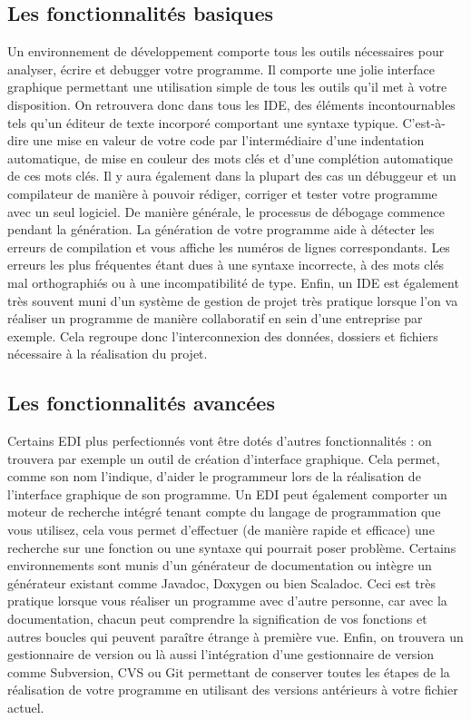\documentclass[a4paper, 12pt]{article}
\begin{document}
\begin{doublespace}
\subsection{Les fonctionnalités basiques}
Un environnement de développement comporte tous les outils nécessaires pour analyser, écrire et debugger votre programme. Il comporte une jolie interface graphique permettant une utilisation simple de tous les outils qu’il met à votre disposition.  On retrouvera donc dans tous les IDE, des éléments incontournables tels qu’un éditeur de texte incorporé comportant une syntaxe typique. C’est-à-dire une  mise en valeur de votre code par l'intermédiaire d'une indentation automatique, de mise en couleur des mots clés et d'une complétion automatique de ces mots clés. Il y aura également dans la plupart des cas un débuggeur et un compilateur de manière à pouvoir rédiger, corriger et tester votre programme avec un seul logiciel. De manière générale, le processus de débogage commence pendant la génération. La génération de votre programme  aide à détecter les erreurs de compilation et vous affiche les numéros de lignes correspondants. Les erreurs les plus fréquentes étant dues à une syntaxe incorrecte, à des mots clés mal orthographiés ou à une incompatibilité de type.  Enfin, un IDE est également très souvent muni d’un système de gestion de projet très pratique lorsque l’on va réaliser un programme de manière collaboratif en sein d’une entreprise par exemple. Cela regroupe donc  l’interconnexion des données, dossiers et fichiers nécessaire à la réalisation du projet.

\newpage \subsection{Les fonctionnalités avancées}
Certains EDI plus perfectionnés vont être dotés d’autres fonctionnalités : on trouvera par exemple un outil de création d’interface graphique. Cela permet, comme son nom l’indique, d’aider le programmeur lors de la réalisation de l’interface graphique de son programme.  Un EDI peut également comporter un moteur de recherche intégré tenant compte du langage de programmation que vous utilisez, cela vous permet d’effectuer (de manière rapide et efficace) une recherche sur une fonction ou une syntaxe qui pourrait poser problème. Certains environnements sont munis d’un générateur de documentation ou intègre un générateur existant comme Javadoc, Doxygen ou bien Scaladoc. Ceci est très pratique lorsque vous réaliser un programme avec d’autre personne, car avec la documentation, chacun peut comprendre la signification de vos fonctions et autres boucles qui peuvent paraître étrange à première vue. Enfin, on trouvera un gestionnaire de version ou là aussi l’intégration d’une gestionnaire de version comme Subversion, CVS ou Git permettant de conserver toutes les étapes de la réalisation de votre programme en utilisant des versions antérieurs à votre fichier actuel.

\end{doublespace}
\end{document}
